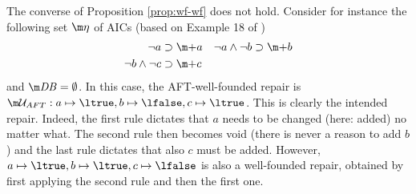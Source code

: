 \begin{example}\label{ex:wf:wf}The converse of Proposition \ref{prop:wf-wf} does
not hold. Consider for instance the following set $\aics$ of AICs (based on Example 18 of \citet{iclp/Cruz-Filipe16})
   \begin{align*}
  \lnot a &\aicrule \add a &
  \lnot a\land \lnot b &\aicrule \add b\\
  \lnot b \land \lnot c &\aicrule \add  c
 \end{align*}
 and $\db=\emptyset$.
 In this case, the AFT-well-founded repair is $\UU_{AFT}: a \mapsto \ltrue, b\mapsto \lfalse, c\mapsto \ltrue$. This is clearly the intended repair. Indeed, the first rule dictates that $a$ needs to be changed (here: added) no matter what. The second rule then becomes void (there is never a reason to add $b$) and the last rule dictates that also $c$ must be added. 
 However, $a \mapsto \ltrue, b\mapsto \ltrue, c\mapsto \lfalse$ is also a well-founded repair, obtained by first applying the second rule and then the first one.
\end{example}

% 
% 

